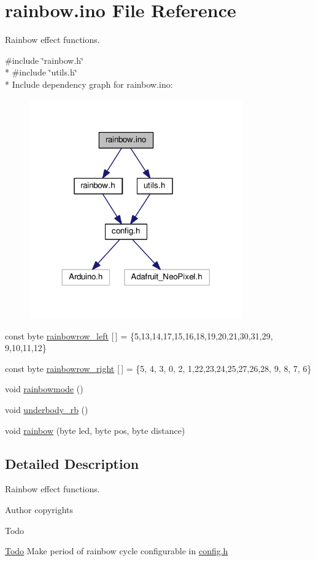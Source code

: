 \hypertarget{rainbow_8ino}{}\section{rainbow.\+ino File Reference}
\label{rainbow_8ino}


Rainbow effect functions.  


{\ttfamily \#include \char`\"{}rainbow.\+h\char`\"{}}\\*
{\ttfamily \#include \char`\"{}utils.\+h\char`\"{}}\\*
Include dependency graph for rainbow.\+ino\+:\nopagebreak
\begin{figure}[H]
\begin{center}
\leavevmode
\includegraphics[width=260pt]{rainbow_8ino__incl}
\end{center}
\end{figure}
\begin{DoxyCompactItemize}
\item 
const byte \hyperlink{group__rainbow_gad4e8497757364dbc8187298bd87acc44}{rainbowrow\+\_\+left} \mbox{[}$\,$\mbox{]} = \{5,13,14,17,15,16,18,19,20,21,30,31,29, 9,10,11,12\}
\item 
const byte \hyperlink{group__rainbow_ga00c047fede9a8b6c020ba1d108d63cea}{rainbowrow\+\_\+right} \mbox{[}$\,$\mbox{]} = \{5, 4, 3, 0, 2, 1,22,23,24,25,27,26,28, 9, 8, 7, 6\}
\item 
void \hyperlink{group__rainbow_ga51e30a1c423190e50127c6651c991612}{rainbowmode} ()
\item 
void \hyperlink{group__rainbow_ga3656f41cfe48a0bf63e63099673ac4c4}{underbody\+\_\+rb} ()
\item 
void \hyperlink{group__rainbow_ga80198b192c269a2b71cfa41654a3aafd}{rainbow} (byte led, byte pos, byte distance)
\end{DoxyCompactItemize}


\subsection{Detailed Description}
Rainbow effect functions. 

\begin{DoxyAuthor}{Author}
copyrights 
\end{DoxyAuthor}
\begin{DoxyRefDesc}{Todo}
\item[\hyperlink{todo__todo000004}{Todo}]Make period of rainbow cycle configurable in \hyperlink{config_8h}{config.\+h} \end{DoxyRefDesc}
